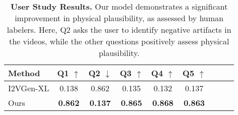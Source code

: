 \begin{appendix}
\begin{table}[h]
    \centering
    \caption{\textbf{User Study Results.} Our model demonstrates a significant improvement in physical plausibility, as assessed by human labelers. Here, Q2 asks the user to identify negative artifacts in the videos, while the other questions positively assess physical plausibility.} 
    \begin{tabular}{lcccccccc}
        \toprule
        Method &
        Q1 $\uparrow$ & Q2 $\downarrow$ & Q3 $\uparrow$ & Q4 $\uparrow$ & Q5 $\uparrow$ 
        \\\midrule
        I2VGen-XL & 0.138 & 0.862 & 0.135 & 0.132 & 0.137 \\
        Ours & \textbf{0.862} & \textbf{0.137} & \textbf{0.865} & \textbf{0.868} & \textbf{0.863} \\
        \bottomrule
    \end{tabular}
    \label{tab:userstudy}
\end{table}


\end{appendix}
